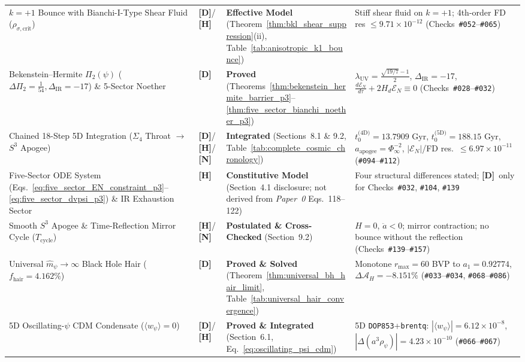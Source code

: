 \documentclass[11pt,a4paper]{article}
\newcommand{\catD}{\textbf{\textcolor{blue!75!black}{[D]}}}
\newcommand{\catH}{\textbf{\textcolor{orange!85!black}{[H]}}}
\newcommand{\catN}{\textbf{\textcolor{teal!75!black}{[N]}}}
\theoremstyle{plain}
\theoremstyle{definition}
\theoremstyle{remark}
\numberwithin{equation}{section}
\begin{document}
\begin{table}[H]
\begin{tabularx}{\textwidth}{@{} L{0.27\textwidth} C{0.12\textwidth} L{0.22\textwidth} Y @{}}
    \addlinespace[2.0pt]
    $k=+1$ Bounce with Bianchi-I-Type Shear Fluid ($\rho_{\sigma,\text{crit}}$) & \catD/\catH & \textbf{Effective Model} (Theorem~\ref{thm:bkl_shear_suppression}(ii), Table~\ref{tab:anisotropic_k1_bounce}) & Stiff shear fluid on $k=+1$; 4th-order FD res $\le 9.71\times 10^{-12}$ (Checks~\texttt{\#052}--\texttt{\#065}) \\
    \addlinespace[2.0pt]
    Bekenstein--Hermite $\Pi_2(\psi)$ ($\Delta\Pi_2=\frac{1}{54}, \Delta_{\text{IR}}=-17$) \& 5-Sector Noether & \catD & \textbf{Proved} (Theorems~\ref{thm:bekenstein_hermite_barrier_p3}--\ref{thm:five_sector_bianchi_noether_p3}) & $\lambda_{\text{UV}} = \frac{\sqrt{19/7}-1}{2}$, $\Delta_{\text{IR}} = -17$, $\frac{d\mathcal{E}_N}{d\tau}+2H_d\mathcal{E}_N \equiv 0$ (Checks~\texttt{\#028}--\texttt{\#032}) \\
    \addlinespace[2.0pt]
    Chained 18-Step 5D Integration ($\Sigma_4$ Throat $\to$ $S^3$ Apogee) & \catD/\catH/\catN & \textbf{Integrated} (Sections~8.1 \& 9.2, Table~\ref{tab:complete_cosmic_chronology}) & $t_0^{\text{(4D)}}=13.7909\text{ Gyr}$, $t_0^{\text{(5D)}}=188.15\text{ Gyr}$, $a_{\text{apogee}}=\Phi_{\infty}^{-2}$, $|\mathcal{E}_N|$/FD res.\ $\le 6.97\times 10^{-11}$ (\texttt{\#094}--\texttt{\#112}) \\
    \addlinespace[2.0pt]
    Five-Sector ODE System (Eqs.~\ref{eq:five_sector_EN_constraint_p3}--\ref{eq:five_sector_dvpsi_p3}) \& IR Exhaustion Sector & \catH & \textbf{Constitutive Model} (Section~4.1 disclosure; not derived from \textit{Paper~0} Eqs.~118--122) & Four structural differences stated; \catD\ only for Checks~\texttt{\#032}, \texttt{\#104}, \texttt{\#139} \\
    \addlinespace[2.0pt]
    Smooth $S^3$ Apogee \& Time-Reflection Mirror Cycle ($T_{\text{cycle}}$) & \catH/\catN & \textbf{Postulated \& Cross-Checked} (Section~9.2) & $H = 0$, $\ddot{a} < 0$; mirror contraction; no bounce without the reflection (Checks~\texttt{\#139}--\texttt{\#157}) \\
    \addlinespace[2.0pt]
    Universal $\hat{m}_{\psi}\to\infty$ Black Hole Hair ($f_{\text{hair}} = 4.162\%$) & \catD & \textbf{Proved \& Solved} (Theorem~\ref{thm:universal_bh_hair_limit}, Table~\ref{tab:universal_hair_convergence}) & Monotone $r_{\max}=60$ BVP to $a_1=0.92774$, $\Delta\mathcal{A}_H=-8.151\%$ (\texttt{\#033}--\texttt{\#034}, \texttt{\#068}--\texttt{\#086}) \\
    \addlinespace[2.0pt]
    5D Oscillating-$\psi$ CDM Condensate ($\langle w_{\psi}\rangle = 0$) & \catD/\catH & \textbf{Proved \& Integrated} (Section~6.1, Eq.~\ref{eq:oscillating_psi_cdm}) & 5D \texttt{DOP853}+\texttt{brentq}: $|\langle w_{\psi}\rangle|=6.12\times 10^{-8}$, $|\Delta(a^3\rho_{\psi})|=4.23\times 10^{-10}$ (\texttt{\#066}--\texttt{\#067}) \\

\end{tabularx}
\end{table}
\end{document}
